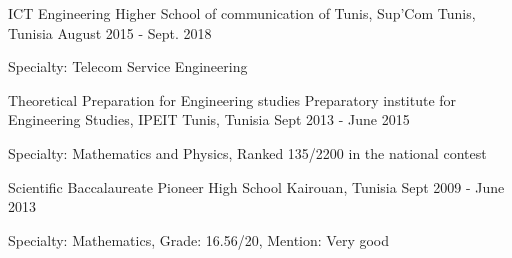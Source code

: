 

\begin{cventries}

  \cventry
    {ICT Engineering} %
    {Higher School of communication of Tunis, Sup'Com} %
    {Tunis, Tunisia} %
    {August 2015 - Sept. 2018} %
    {
      \begin{cvitems} %
        \item { Specialty: Telecom Service Engineering}
      \end{cvitems}
    }
    
    \cventry
    {Theoretical Preparation for Engineering studies } %
    {Preparatory institute for Engineering Studies, IPEIT} %
    {Tunis, Tunisia} %
    {Sept 2013 - June 2015} %
    {
      \begin{cvitems} %
        \item { Specialty: Mathematics and Physics, Ranked 135/2200 in the national contest}
      \end{cvitems}
    }
    
     \cventry
    {Scientific Baccalaureate} %
    {Pioneer High School} %
    {Kairouan, Tunisia} %
    {Sept 2009 - June 2013} %
    {
      \begin{cvitems} %
        \item { Specialty: Mathematics, Grade: 16.56/20, Mention: Very good }
      \end{cvitems}
    }

\end{cventries}
